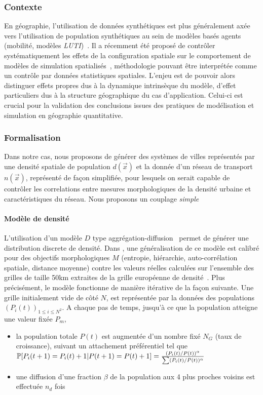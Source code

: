\subsubsection{Contexte}


En géographie, l'utilisation de données synthétiques est plus généralement axée vers l'utilisation de population synthétiques au sein de modèles basés agents (mobilité, modèles \emph{LUTI})~\cite{pritchard2009advances}. Il a récemment été proposé de contrôler systématiquement les effets de la configuration spatiale sur le comportement de modèles de simulation spatialisés~\cite{cottineau2015revisiting}, méthodologie pouvant être interprétée comme un contrôle par données statistiques spatiales. L'enjeu est de pouvoir alors distinguer effets propres dus à la dynamique intrinsèque du modèle, d'effet particuliers dus à la structure géographique du cas d'application. Celui-ci est crucial pour la validation des conclusions issues des pratiques de modélisation et simulation en géographie quantitative.


\subsubsection{Formalisation}

Dans notre cas, nous proposons de générer des systèmes de villes représentés par une densité spatiale de population $d(\vec{x})$ et la donnée d'un réseau de transport $n(\vec{x})$, représenté de façon simplifiée, pour lesquels on serait capable de contrôler les correlations entre mesures morphologiques de la densité urbaine et caractéristiques du réseau. Nous proposons un couplage \emph{simple}


\paragraph{Modèle de densité}

L'utilisation d'un modèle $D$ type aggrégation-diffusion~\cite{batty2006hierarchy} permet de générer une distribution discrete de densité. Dans \cite{}, %
une généralisation de ce modèle est calibré pour des objectifs morphologiques $M$ (entropie, hiérarchie, auto-corrélation spatiale, distance moyenne) contre les valeurs réelles calculées sur l'ensemble des grilles de taille 50km extraites de la grille européenne de densité~\cite{eurostat}. Plus précisément, le modèle fonctionne de manière itérative de la façon suivante. Une grille initialement vide de côté $N$, est représentée par la données des populations $(P_i(t))_{1\leq i\leq N^2}$. A chaque pas de temps, jusqu'à ce que la population atteigne une valeur fixée $P_m$,
\begin{itemize}
\item la population totale $P(t)$ est augmentée d'un nombre fixé $N_G$ (taux de croissance), suivant un attachement préférentiel tel que $\operatorname{\mathbb{P}}\!\left[P_i(t+1)=P_i(t)+1|P(t+1)=P(t)+1\right]=\frac{(P_i(t)/P(t))^{\alpha}}{\sum(P_i(t)/P(t))^{\alpha}}$
\item une diffusion d'une fraction $\beta$ de la population aux 4 plus proches voisins est effectuée $n_d$ fois
\end{itemize}

